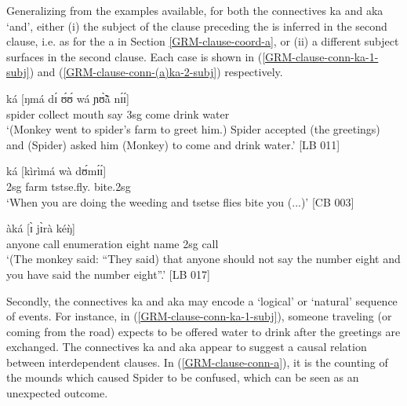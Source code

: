 Generalizing from the examples available, for both the connectives {\sls ka} 
and 
{\sls aka} `and', either (i) the subject of the clause preceding the  is 
inferred in the second clause, i.e. as for  the   {\sls a} in Section \ref{GRM-clause-coord-a}, or 
(ii) a different subject surfaces in the second clause. Each case is shown in 
(\ref{GRM-clause-conn-ka-1-subj}) and (\ref{GRM-clause-conn-(a)ka-2-subj}) 
respectively.   


\ea\label{GRM-clause-conn-ka-1-subj} 
 ká  [ŋmá dɪ́ ʊ́ʊ́  
wá  
ɲʊ̃̀ã̀ nɪ́ɪ́]\\
spider collect mouth {\postp}  {\conn} say {\comp}  
{\sc 3sg}  come   drink water\\
\glt  `(Monkey went to spider's farm to greet him.) Spider accepted
(the
greetings) and (Spider) asked him (Monkey) to come and drink water.'  [LB 011]
 \z



\ea\label{GRM-clause-conn-(a)ka-2-subj} 

\ea\label{GRM-clause-conn-ka-2-subj} 
\gll  [dɪ̀  ɪ̀    wáà    párà]  ká [kìrìmá  wà 
dʊ́mɪ́ɪ́]\\
{\conn} {\sc 2sg} {\ingr}  farm {\conn} 
tstse.fly.{\pl}  {\ingr}  bite.{\sc 2sg}\\
\glt  `When  you are doing the weeding and  tsetse flies bite
you (...)' [CB 003]

\newpage
\ex\label{GRM-clause-conn-aka-2-subj} 
 àká [ɪ̀ jɪ̀rà   kéŋ̀]\\
{\comp}   anyone     {\neg}   {\itr} {\ingr}  
   call   enumeration    
eight name   {\conn}   {\sc 2sg}   call  {\dxm}\\
\glt  `(The monkey said:  ``They said) that anyone should not say the
number eight and you have said the number eight''.' [LB
017] 

\z 
 \z


Secondly, the connectives  {\sls ka} and {\sls aka}  may encode a `logical' or `natural' sequence of events.   For instance, in (\ref{GRM-clause-conn-ka-1-subj}), someone traveling (or coming from the road) expects to be offered water to drink after the greetings are exchanged. The  connectives  {\sls ka} and {\sls aka} appear to suggest a causal relation between interdependent clauses. In (\ref{GRM-clause-conn-a}), it is the counting of the mounds which caused Spider to be confused, which can be seen as an unexpected outcome.  

